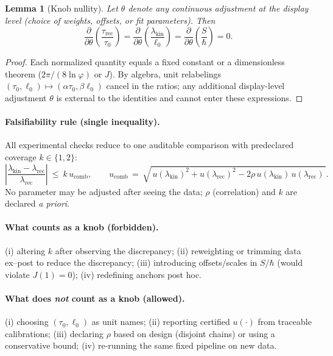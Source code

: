 \documentclass[11pt]{article}
\theoremstyle{plain}
\newtheorem{lemma}{Lemma}
\theoremstyle{definition}
\theoremstyle{remark}
\begin{document}
\begin{lemma}[Knob nullity]
Let \(\theta\) denote any continuous adjustment at the display level (choice of weights, offsets, or fit parameters). Then
\[
\frac{\partial}{\partial\theta}\left(\frac{\tau_{\mathrm{rec}}}{\tau_{0}}\right)
=
\frac{\partial}{\partial\theta}\left(\frac{\lambda_{\mathrm{kin}}}{\ell_{0}}\right)
=
\frac{\partial}{\partial\theta}\left(\frac{S}{\hbar}\right)
=0.
\]
\end{lemma}

\begin{proof}
Each normalized quantity equals a fixed constant or a dimensionless theorem (\(2\pi/(8\ln\varphi)\) or \(J\)). By algebra, unit relabelings \((\tau_{0},\ell_{0})\mapsto(\alpha\tau_{0},\beta\ell_{0})\) cancel in the ratios; any additional display-level adjustment \(\theta\) is external to the identities and cannot enter these expressions.
\end{proof}

\paragraph{Falsifiability rule (single inequality).}
All experimental checks reduce to one auditable comparison with pre\-declared coverage \(k\in\{1,2\}\):
\[
\left|\frac{\lambda_{\mathrm{kin}}-\lambda_{\mathrm{rec}}}{\lambda_{\mathrm{rec}}}\right|
\ \le\ 
k\,u_{\mathrm{comb}},
\qquad
u_{\mathrm{comb}}\,=\,\sqrt{\,u(\lambda_{\mathrm{kin}})^{2}+u(\lambda_{\mathrm{rec}})^{2}-2\rho\,u(\lambda_{\mathrm{kin}})\,u(\lambda_{\mathrm{rec}})\,}.
\]
No parameter may be adjusted after seeing the data; \(\rho\) (correlation) and \(k\) are declared \emph{a priori}.

\paragraph{What counts as a knob (forbidden).}
(i) altering \(k\) after observing the discrepancy; (ii) reweighting or trimming data ex–post to reduce the discrepancy; (iii) introducing offsets/scales in \(S/\hbar\) (would violate \(J(1)=0\)); (iv) redefining anchors post hoc.

\paragraph{What does \emph{not} count as a knob (allowed).}
(i) choosing \((\tau_{0},\ell_{0})\) as unit names; (ii) reporting certified \(u(\cdot)\) from traceable calibrations; (iii) declaring \(\rho\) based on design (disjoint chains) or using a conservative bound; (iv) re-running the same fixed pipeline on new data.
\end{document}
